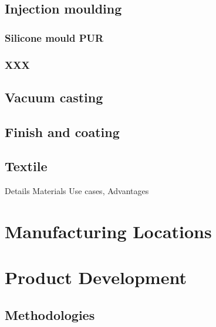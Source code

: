 \subsection{Injection moulding}

\subsubsection{Silicone mould PUR}

\subsubsection{XXX}

\subsection{Vacuum casting}

\subsection{Finish and coating}

\subsection{Textile}

Details
Materials
Use cases, 
Advantages








\section{Manufacturing Locations}



\section{Product Development}

\subsection{Methodologies}

